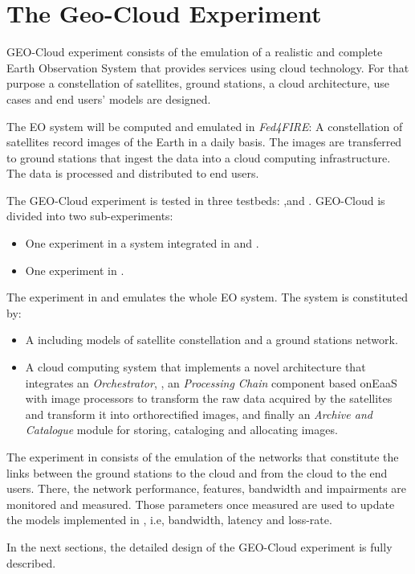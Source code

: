 
\chapter{The Geo-Cloud Experiment}
\label{chap:geocloud-experiment}
 GEO-Cloud experiment consists of the emulation of a realistic and complete Earth Observation System that provides services using cloud technology. For that purpose a constellation of satellites, ground stations, a cloud architecture, use cases and end users' models are designed.

The \ac{EO} system will be computed and emulated in \emph{Fed4FIRE}: A constellation of satellites record images of the Earth in a daily basis. The images are transferred to ground stations that ingest the data into a cloud computing infrastructure. The data is processed and distributed to end users.

The GEO-Cloud experiment is tested in three testbeds: \vw,\bonfire and
\pl. GEO-Cloud is divided into two sub-experiments:
\begin{itemize}
\item One experiment in a system integrated in \vw and \bonfire.
\item One experiment in \pl.
\end{itemize}

The experiment in \vw and \bonfire emulates the whole \ac{EO} system. The system is constituted by:

\begin{itemize}
\item A \sss including models of satellite constellation and a ground stations
  network.
\item A cloud computing system that implements a novel architecture that
  integrates an \emph{Orchestrator}, , an \emph{Processing Chain} component
  based on\ac{EaaS}  with image processors to transform the raw data acquired by the satellites and
  transform it into orthorectified images, and finally an \emph{Archive and Catalogue}
  module for storing, cataloging and allocating images.
\end{itemize}

The experiment in \pl consists of the emulation of the networks that constitute
the links between the ground stations to the cloud and from the cloud to the end
users. There, the network performance, features, bandwidth and impairments are
monitored and measured. Those parameters once measured are used to update the
models implemented in \vw, i.e, bandwidth, latency and loss-rate.

In the next sections, the detailed design of the GEO-Cloud experiment is fully described.

















